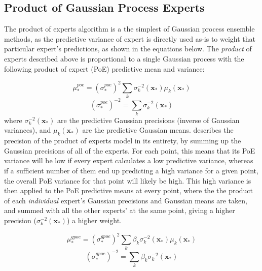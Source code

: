 \subsection{Product of Gaussian Process Experts}
The product of experts algorithm is a the simplest of Gaussian process ensemble methods, as the predictive variance of expert is directly used as-is to weight that particular expert's predictions, as shown in the equations below. The \textit{product} of experts described above is proportional to a single Gaussian process with the following product of expert (PoE) predictive mean and variance:

\begin{equation}
    \mu_*^{poe} = (\sigma_*^{poe})^2 \sum_k \sigma_k^{-2} (\mathbf{x_*}) \mu_k (\mathbf{x_*})
\end{equation}
\begin{equation}\label{eq:poe-precision}
    (\sigma_*^{poe})^{-2} = \sum_k \sigma_k^{-2} (\mathbf{x_*})
\end{equation}
where $\sigma_k^{-2}(\mathbf{x_*})$ are the predictive Gaussian precisions (inverse of Gaussian variances), and $\mu_k(\mathbf{x_*})$ are the predictive Gaussian means.  describes the precision of the product of experts model in its entirety, by summing up the Gaussian precisions of all of the experts. For each point, this means that its PoE variance will be low if every expert calculates a low predictive variance, whereas if a sufficient number of them end up predicting a high variance for a given point, the overall PoE variance for that point will likely be high. This high variance is then applied to the PoE predictive means at every point, where the the product of each \textit{individual} expert's Gaussian precisions and Gaussian means are taken, and summed with all the other experts' at the same point, giving a higher precision ($\sigma_k^{-2}(\mathbf{x_*})$) a higher weight.

\begin{equation}
    \mu_*^{gpoe} = (\sigma_*^{gpoe})^2 \sum_k \beta_k \sigma_k^{-2} (\mathbf{x_*}) \mu_k (\mathbf{x_*})
\end{equation}
\begin{equation}
    (\sigma_*^{gpoe})^{-2} = \sum_k \beta_k \sigma_k^{-2} (\mathbf{x_*})
\end{equation}


